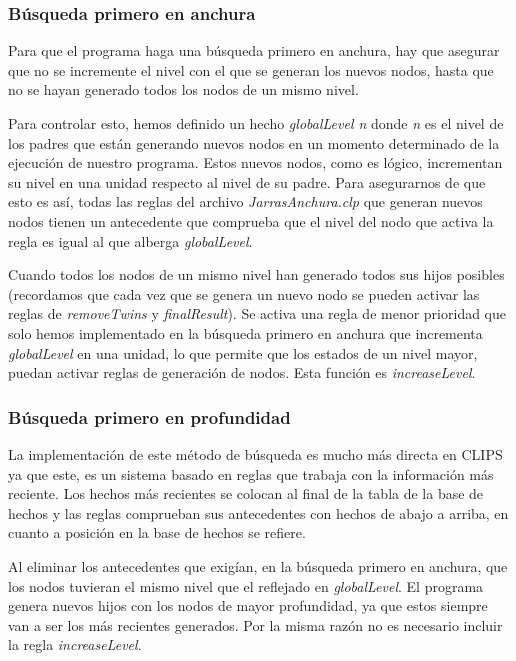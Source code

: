 \documentclass[11pt,a4paper,final]{article}
\begin{document}
\subsubsection{Búsqueda primero en anchura} \label{anchura}
Para que el programa haga una búsqueda primero en anchura, hay que asegurar que no se incremente el nivel con el que se generan los nuevos nodos, hasta que no se hayan generado todos los nodos de un mismo nivel. 

Para controlar esto, hemos definido un hecho \emph{globalLevel n} donde \emph{n} es el nivel de los padres que están generando nuevos nodos en un momento determinado de la ejecución de nuestro programa. Estos nuevos nodos, como es lógico, incrementan su nivel en una unidad respecto al nivel de su padre. Para asegurarnos de que esto es así, todas las reglas del archivo \emph{JarrasAnchura.clp} que generan nuevos nodos tienen un antecedente que comprueba que el nivel del nodo que activa la regla es igual al que alberga \emph{globalLevel}.

Cuando todos los nodos de un mismo nivel han generado todos sus hijos posibles (recordamos que cada vez que se genera un nuevo nodo se pueden activar las reglas de \emph{removeTwins} y \emph{finalResult}). Se activa una regla de menor prioridad que solo hemos implementado en la búsqueda primero en anchura que  incrementa \emph{globalLevel} en una unidad, lo que permite que los estados de un nivel mayor, puedan activar reglas de generación de nodos. Esta función es \emph{increaseLevel}.

\subsubsection{Búsqueda primero en profundidad} \label{profundidad} 
La implementación de este método de búsqueda es mucho más directa en CLIPS ya que este, es un sistema basado en reglas que trabaja con la información más reciente. Los hechos más recientes se colocan al final de la tabla de la base de hechos y las reglas comprueban sus antecedentes con hechos de abajo a arriba, en cuanto a posición en la base de hechos se refiere.

Al eliminar los antecedentes que exigían, en la búsqueda primero en anchura, que los nodos tuvieran el mismo nivel que el reflejado en \emph{globalLevel}. El programa genera nuevos hijos con los nodos de mayor profundidad, ya que estos siempre van a ser los más recientes generados. Por la misma razón no es necesario incluir la regla \emph{increaseLevel}.
\end{document}
